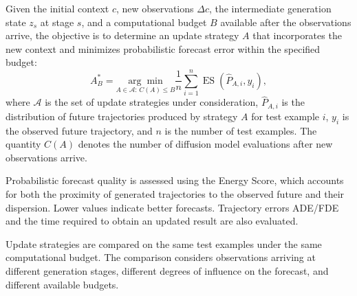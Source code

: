 \documentclass{article}
\begin{document}
Given the initial context $c$, new observations $\Delta c$, the intermediate generation state $z_s$ at stage $s$, and a computational budget $B$ available after the observations arrive, the objective is to determine an update strategy $A$ that incorporates the new context and minimizes probabilistic forecast error within the specified budget:
\begin{equation}
A_B^{*}
=
\underset{A\in\mathcal A:\,C(A)\le B}{\arg\min}
\frac{1}{n}\sum_{i=1}^{n}
\operatorname{ES}\!\left(\widehat P_{A,i},y_i\right),
\end{equation}
where $\mathcal A$ is the set of update strategies under consideration, $\widehat P_{A,i}$ is the distribution of future trajectories produced by strategy $A$ for test example $i$, $y_i$ is the observed future trajectory, and $n$ is the number of test examples. The quantity $C(A)$ denotes the number of diffusion model evaluations after new observations arrive.

Probabilistic forecast quality is assessed using the Energy Score, which accounts for both the proximity of generated trajectories to the observed future and their dispersion. Lower values indicate better forecasts. Trajectory errors ADE/FDE and the time required to obtain an updated result are also evaluated.

Update strategies are compared on the same test examples under the same computational budget. The comparison considers observations arriving at different generation stages, different degrees of influence on the forecast, and different available budgets.

\clearpage


\end{document}
